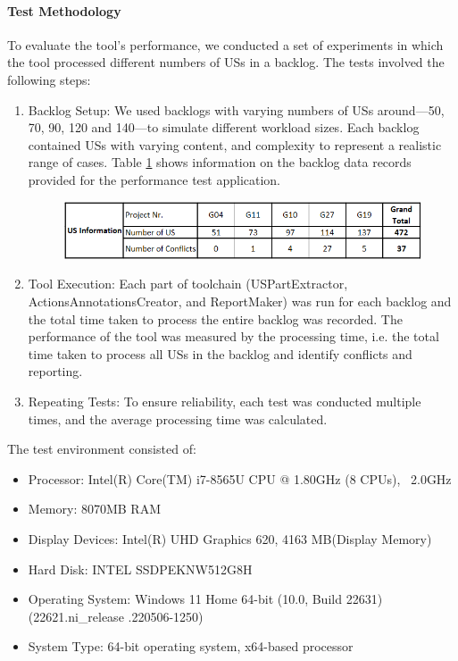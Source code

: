 \paragraph{Test Methodology}To evaluate the tool's performance, we conducted a set of experiments in which the tool processed different numbers of USs in a backlog. The tests involved the following steps:
\begin{enumerate}
	\item Backlog Setup: We used backlogs with varying numbers of USs around—50, 70, 90, 120 and 140—to simulate different workload sizes. Each backlog contained USs with varying content, and complexity to represent a realistic range of cases. Table \ref{tb:conflict_performance_env} shows information on the backlog data records provided for the performance test application.
	\begin{figure}[h]
		\begingroup
		\scriptsize
		\centering
		\includegraphics[scale=0.7]{Table/conflict_performance_env.png}
		\label{tb:conflict_performance_env}
		\endgroup
	\end{figure}
	\item Tool Execution: Each part of toolchain (USPartExtractor, ActionsAnnotationsCreator, and ReportMaker) was run for each backlog and the total time taken to process the entire backlog was recorded. The performance of the tool was measured by the processing time, i.e. the total time taken to process all USs in the backlog and identify conflicts and reporting.
	
	\item Repeating Tests: To ensure reliability, each test was conducted multiple times, and the average processing time was calculated.
\end{enumerate}
The test environment consisted of:
\begin{itemize}
	\item Processor: Intel(R) Core(TM) i7-8565U CPU @ 1.80GHz (8 CPUs), ~2.0GHz		
	\item Memory: 8070MB RAM
	\item Display Devices: Intel(R) UHD Graphics 620, 4163 MB(Display Memory)
	\item Hard Disk: INTEL SSDPEKNW512G8H
	\item Operating System: Windows 11 Home 64-bit (10.0, Build 22631) (22621.ni\_release .220506-1250)
	\item System Type: 64-bit operating system, x64-based processor
\end{itemize}
